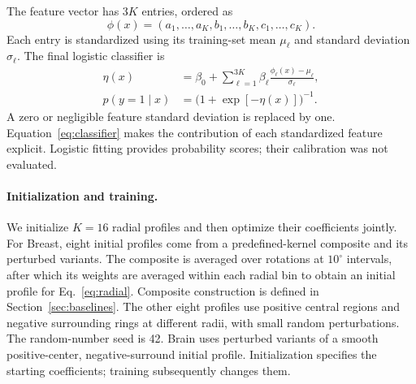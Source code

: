 \documentclass[10pt,twocolumn]{article}
\begin{document}
The feature vector has $3K$ entries, ordered as
\[\phi(x)=(a_1,\ldots,a_K,b_1,\ldots,b_K,c_1,\ldots,c_K).\] Each entry is standardized using its training-set mean $\mu_\ell$ and standard deviation $\sigma_\ell$. The final logistic classifier is
\begin{equation}
\begin{aligned}
\eta(x)&=\beta_0+\sum_{\ell=1}^{3K}\beta_\ell\frac{\phi_\ell(x)-\mu_\ell}{\sigma_\ell},\\
p(y=1\mid x)&=\bigl(1+\exp[-\eta(x)]\bigr)^{-1}.
\end{aligned}
\label{eq:classifier}
\end{equation}
A zero or negligible feature standard deviation is replaced by one. Equation~\eqref{eq:classifier} makes the contribution of each standardized feature explicit. Logistic fitting provides probability scores; their calibration was not evaluated.

\paragraph{Initialization and training.}
We initialize $K=16$ radial profiles and then optimize their coefficients jointly. For Breast, eight initial profiles come from a predefined-kernel composite and its perturbed variants. The composite is averaged over rotations at $10^\circ$ intervals, after which its weights are averaged within each radial bin to obtain an initial profile for Eq.~\eqref{eq:radial}. Composite construction is defined in Section~\ref{sec:baselines}. The other eight profiles use positive central regions and negative surrounding rings at different radii, with small random perturbations. The random-number seed is 42. Brain uses perturbed variants of a smooth positive-center, negative-surround initial profile. Initialization specifies the starting coefficients; training subsequently changes them.
\end{document}
